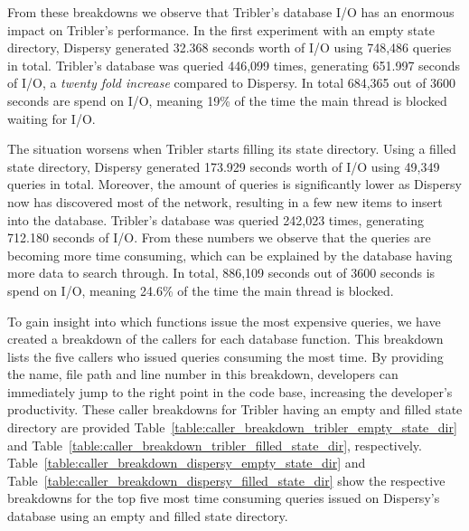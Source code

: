 From these breakdowns we observe that Tribler's database I/O has an enormous impact on Tribler's performance.
In the first experiment with an empty state directory, Dispersy generated 32.368 seconds worth of I/O using 748,486 queries in total. 
Tribler's database was queried 446,099 times, generating 651.997 seconds of I/O, a \emph{twenty fold increase} compared to Dispersy.
In total 684,365 out of 3600 seconds are spend on I/O, meaning 19\% of the time the main thread is blocked waiting for I/O.

The situation worsens when Tribler starts filling its state directory.
Using a filled state directory, Dispersy generated 173.929 seconds worth of I/O using 49,349 queries in total.
Moreover, the amount of queries is significantly lower as Dispersy now has discovered most of the network, resulting in a few new items to insert into the database.
Tribler's database was queried 242,023 times, generating 712.180 seconds of I/O.
From these numbers we observe that the queries are becoming more time consuming, which can be explained by the database having more data to search through.
In total, 886,109 seconds out of 3600 seconds is spend on I/O, meaning 24.6\% of the time the main thread is blocked.

To gain insight into which functions issue the most expensive queries, we have created a breakdown of the callers for each database function.
This breakdown lists the five callers who issued queries consuming the most time.
By providing the name, file path and line number in this breakdown, developers can immediately jump to the right point in the code base, increasing the developer's productivity.
These caller breakdowns for Tribler having an empty and filled state directory are provided Table~\ref{table:caller_breakdown_tribler_empty_state_dir} and Table~\ref{table:caller_breakdown_tribler_filled_state_dir}, respectively.
Table~\ref{table:caller_breakdown_dispersy_empty_state_dir} and Table~\ref{table:caller_breakdown_dispersy_filled_state_dir} show the respective breakdowns for the top five most time consuming queries issued on Dispersy's database using an empty and filled state directory.
	
	
